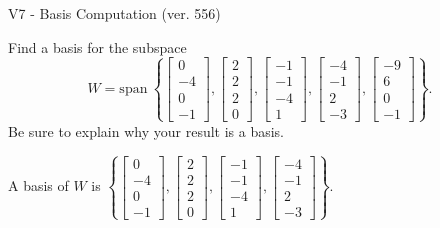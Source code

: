 \begin{exercise}
  \begin{exerciseTitle}V7 - Basis Computation (ver. 556)\end{exerciseTitle}
  \begin{exerciseStatement}
    Find a basis for the subspace 
\[W=\mathrm{span}\ \left\{\left[\begin{array}{r}
0 \\
-4 \\
0 \\
-1
\end{array}\right] , \left[\begin{array}{r}
2 \\
2 \\
2 \\
0
\end{array}\right] , \left[\begin{array}{r}
-1 \\
-1 \\
-4 \\
1
\end{array}\right] , \left[\begin{array}{r}
-4 \\
-1 \\
2 \\
-3
\end{array}\right] , \left[\begin{array}{r}
-9 \\
6 \\
0 \\
-1
\end{array}\right]\right\}.\]
 Be sure to explain why your result is a basis.


  \end{exerciseStatement}
  \begin{exerciseAnswer}
   A basis of \(W\) is  \(\left\{\left[\begin{array}{r}
0 \\
-4 \\
0 \\
-1
\end{array}\right] , \left[\begin{array}{r}
2 \\
2 \\
2 \\
0
\end{array}\right] , \left[\begin{array}{r}
-1 \\
-1 \\
-4 \\
1
\end{array}\right] , \left[\begin{array}{r}
-4 \\
-1 \\
2 \\
-3
\end{array}\right]\right\}\).
  


  \end{exerciseAnswer}
\end{exercise}